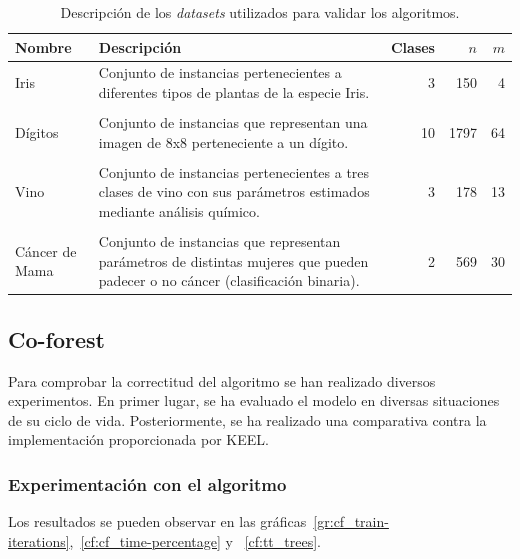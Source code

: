 \begin{table}
	\small
	\begin{centering}
		\begin{tabular}{@{}p{4em} p{20em} r r r @{}}
			\toprule
			\textbf{Nombre} & \textbf{Descripción} & \textbf{Clases} & $n$ & $m$\\ 
			\midrule
			
			Iris & Conjunto de instancias pertenecientes a diferentes tipos de plantas de la especie Iris. & 3 & 150 & 4 \\\\
			Dígitos & Conjunto de instancias que representan una imagen de 8x8 perteneciente a un dígito. & 10 & 1797 & 64 \\\\
			Vino & Conjunto de instancias pertenecientes a tres clases de vino con sus parámetros estimados mediante análisis químico. & 3 & 178 & 13 \\\\
			Cáncer de Mama & Conjunto de instancias que representan parámetros de distintas mujeres que pueden padecer o no cáncer (clasificación binaria). & 2 & 569 & 30 \\
			\bottomrule
		\end{tabular}
	\end{centering}
	\caption[Experimentación: \textit{datasets} estándar]{Descripción de los \textit{datasets} utilizados para validar los algoritmos.}
	\label{tabla_datasets_sklearn}	
\end{table}



\subsection{Co-forest}

Para comprobar la correctitud del algoritmo se han realizado diversos experimentos. En primer lugar, se ha evaluado el modelo en diversas situaciones de su ciclo de vida. Posteriormente, se ha realizado una comparativa contra la implementación proporcionada por KEEL.

\subsubsection{Experimentación con el algoritmo}

Los resultados se pueden observar en las gráficas~\ref{gr:cf_train-iterations},~\ref{cf:cf_time-percentage} y ~\ref{cf:tt_trees}.



